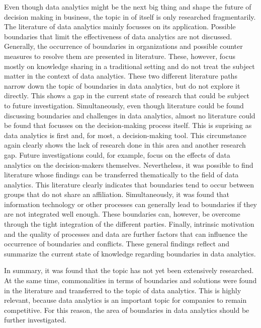 Even though data analytics might be the next big thing and shape the future of decision making in business, the topic in of itself is only researched fragmentarily. The literature of data analytics mainly focusses on its application. Possible boundaries that limit the effectiveness of data analytics are not discussed. Generally, the occurrence of boundaries in organizations and possible counter measures to resolve them are presented in literature. These, however, focus mostly on knowledge sharing in a traditional setting and do not treat the subject matter in the context of data analytics. These two different literature paths narrow down the topic of boundaries in data analytics, but do not explore it directly. This shows a gap in the current state of research that could be subject to future investigation. Simultaneously, even though literature could be found discussing boundaries and challenges in data analytics, almost no literature could be found that focusses on the decision-making process itself. This is suprising as data analytics is first and, for most, a decision-making tool. This circumstance again clearly shows the lack of research done in this area and another research gap. Future investigations could, for example, focus on the effects of data analytics on the decision-makers themselves. Nevertheless, it was possible to find literature whose findings can be transferred thematically to the field of data analytics. This literature clearly indicates that boundaries tend to occur between groups that do not share an affiliation. Simultaneously, it was found that information technology or other processes can generally lead to boundaries if they are not integrated well enough. These boundaries can, however, be overcome through the tight integration of the different parties. Finally, intrinsic motivation and the quality of processes and data are further factors that can influence the occurrence of boundaries and conflicts. These general findings reflect and summarize the current state of knowledge regarding boundaries in data analytics.

In summary, it was found that the topic has not yet been extensively researched. At the same time, commonalities in terms of boundaries and solutions were found in the literature and transferred to the topic of data analytics. This is highly relevant, because data analytics is an important topic for companies to remain competitive. For this reason, the area of boundaries in data analytics should be further investigated.


